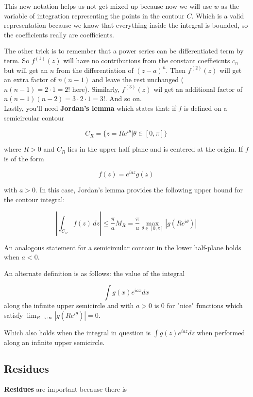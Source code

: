 This new notation helps us not get mixed up because now we will use $w$ as the variable of integration
representing the points in the contour $C$.
Which is a valid representation because we know that everything inside the integral is bounded,
so the coefficients really are coefficients.

The other trick is to remember that a power series can be differentiated term by term.
So $f^{(1)}(z)$ will have no contributions from the constant coeffieicnts $c_n$ but will get an $n$
from the differentiation of $\left(z-a\right)^n$.
Then $f^{(2)}(z)$ will get an extra factor of $n(n-1)$ and leave the rest unchanged ($n(n-1) = 2\cdot1 = 2!$ here).
Similarly,
$f^{(3)}(z)$ wil get an additional factor of $n(n-1)(n-2) = 3\cdot 2 \cdot 1 = 3!$.
And so on.
\\

Lastly, you'll need \textbf{Jordan's lemma} which states that:
if $f$ is defined on a semicircular contour

$$
C_{R} = \{ z = Re^{i\theta} | \theta \in [0, \pi] \}
$$

where $R > 0$ and $C_R$ lies in the upper half plane and is centered at the origin.
If $f$ is of the form

$$
f(z) = e^{iaz} g(z)
$$

with $a>0$.
In this case, Jordan's lemma provides the following upper bound for the contour integral:

$$
\left| \int_{C_{R}} f(z) \, dz \right| \leq \frac{\pi}{a} M_R
    = \frac{\pi}{a} \max_{\theta \in [0,\pi]} \left| g \left(Re^{i\theta}\right) \right|
$$

An analogous statement for a semicircular contour in the lower half-plane holds when $a < 0$. 

An alternate definition is as follows:
the value of the integral

$$
\int g(x) e^{iax} dx
$$
along the infinite upper semicircle and with $a>0$ is 0 for "nice" functions which satisfy
$\lim_{R\rightarrow \infty} \left| g\left(Re^{i\theta}\right) \right| = 0$.

Which also holds when the integral in question is $\int g(z) e^{iaz} dz$ when performed along
an infinite upper semicircle.

\subsection{Residues}

\textbf{Residues} are important because there is 